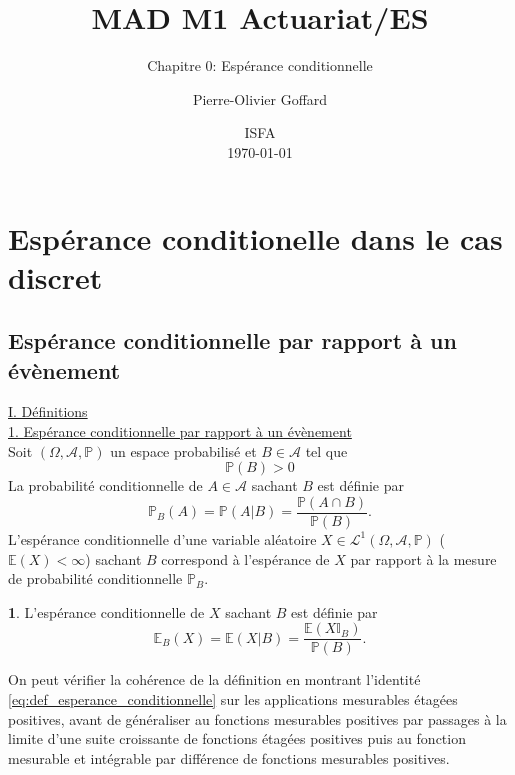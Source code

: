 \documentclass[8pt,notheorems]{beamer}
\title[]{MAD M1 Actuariat/ES}
\subtitle{Chapitre 0: Espérance conditionnelle}
\author{Pierre-Olivier Goffard}
\institute{
	   Université de Lyon 1\\
	ISFA\\
	   \texttt{pierre-olivier.goffard@univ-lyon1.fr}
	  }
\date{
ISFA\\
\today}
\def \E{\mathbb E}
\renewcommand{\Pr}{\mathbb{P}}
\theoremstyle{definition}
\newtheorem{definition}{\translate{Definition}}
\theoremstyle{example}
\theoremstyle{mystyle}
\theoremstyle{plain}
\begin{document}
\frame{\titlepage}


\section{Espérance conditionelle dans le cas discret}
\subsection{Espérance conditionnelle par rapport à un évènement}
\begin{frame}[allowframebreaks]
\underline{I. Définitions}\\
\underline{1. Espérance conditionnelle par rapport à un évènement}\\
Soit $(\Omega, \mathcal{A},\mathbb{P})$ un espace probabilisé et $B\in\mathcal{A}$ tel que 
$$
\mathbb{P}(B)>0
$$
La probabilité conditionnelle de $A\in\mathcal{A}$ sachant $B$ est définie par 
$$
\mathbb{P}_B(A) =\mathbb{P}(A|B) = \frac{\mathbb{P}(A\cap B)}{\mathbb{P}(B)}. 
$$
L'espérance conditionnelle d'une variable aléatoire $X\in \mathcal{L}^1(\Omega, \mathcal{A},\Pr)$ ($\E(X)<\infty$) sachant $B$ correspond à l'espérance de $X$ par rapport à la mesure de probabilité conditionnelle $\Pr_B$. 
\begin{definition}
L'espérance conditionnelle de $X$ sachant $B$ est définie par
\begin{equation}\label{eq:def_esperance_conditionnelle}
\mathbb{E}_B(X) =\mathbb{E}(X|B) = \frac{\E(X\mathbb{I}_B)}{\mathbb{P}(B)}.
\end{equation}
\end{definition}
On peut vérifier la cohérence de la définition en montrant l'identité \eqref{eq:def_esperance_conditionnelle} sur les applications mesurables étagées positives, avant de généraliser au fonctions mesurables positives par passages à la limite d'une suite croissante de fonctions étagées positives puis au fonction mesurable et intégrable par différence de fonctions mesurables positives. \\


\end{frame}
\end{document}
